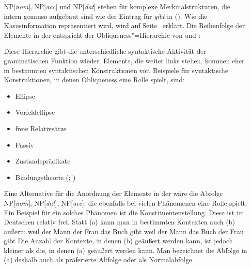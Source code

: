NP[\textit{nom\/}], NP[\textit{acc}] und NP[\textit{dat}] stehen für komplexe Merkmalstrukturen, die intern
genauso aufgebaut sind wie der Eintrag für \emph{gibt} in (). Wie die Kasusinformation
repräsentiert wird, wird auf Seite~\pageref{page-ref-case-feat} erklärt.
%
Die Reihenfolge der Elemente in der \subcatl entspricht der Obliqueness"=Hierarchie
von \citet{KC77a} und \citet{Pullum77a}:
\begin{table}[H]
\label{page-obliquen-h}
\end{table}
\noindent
Diese Hierarchie gibt die unterschiedliche syntaktische Aktivität der grammatischen Funktion wieder.
Elemente, die weiter links stehen, kommen eher in bestimmten syntaktischen Konstruktionen vor. Beispiele
für syntaktische Konstruktionen, in denen Obliqueness eine Rolle spielt, sind:
\begin{itemize}
\item Ellipse \citep{Klein85}
\item Vorfeldellipse \citep{Fries88b}
\item freie Relativsätze
      \citep{Bausewein90,Pittner95b,Mueller99b}
\item Passiv \citep{KC77a}
\item Zustandsprädikate \citep{Mueller2001c,Mueller2002b,Mueller2008a}
\item Bindungstheorie (\citealp{Grewendorf85a}; \citealp{PS92a,ps2})
\end{itemize}

\noindent
Eine Alternative für die Anordnung der Elemente in der \subcatl wäre die Abfolge 
NP[\textit{nom\/}], NP[\textit{dat}], NP[\textit{acc}], die ebenfalls bei vielen Phänomenen eine Rolle spielt. 
Ein Beispiel für ein solches Phänomen ist die Konstituentenstellung. Diese ist im Deutschen relativ frei. Statt (a) kann
man in bestimmten Kontexten auch (b) äußern:
\eal
\ex weil der Mann der Frau das Buch gibt
\ex weil der Mann das Buch der Frau gibt
\zl
Die Anzahl der Kontexte, in denen (b) geäußert werden kann, ist jedoch kleiner
als die, in denen (a) geäußert werden kann. Man bezeichnet die Abfolge in (a)
deshalb auch als präferierte Abfolge oder als Normalabfolge \citep{Hoehle82a}.

